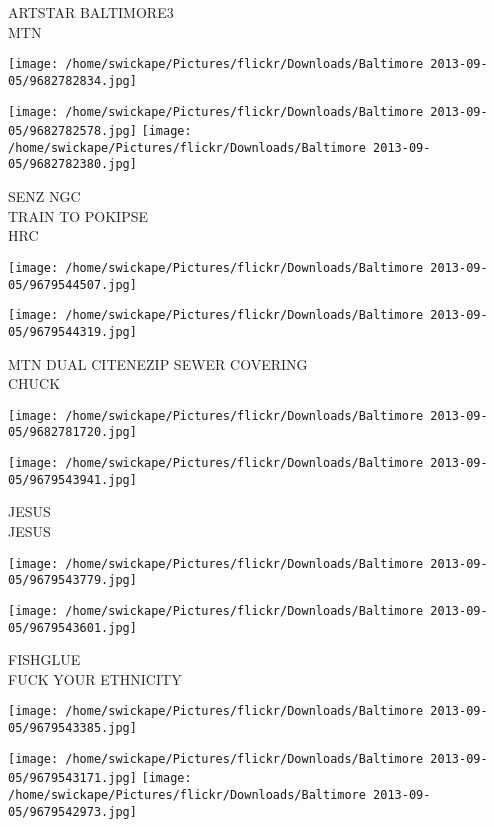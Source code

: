 \documentclass[10pt,letterpaper]{article}
\begin{document}
ARTSTAR BALTIMORE3\\
MTN
\pagebreak

\texttt{[image: /home/swickape/Pictures/flickr/Downloads/Baltimore 2013-09-05/9682782834.jpg]}

\vspace{0.25in}
\texttt{[image: /home/swickape/Pictures/flickr/Downloads/Baltimore 2013-09-05/9682782578.jpg]}
\texttt{[image: /home/swickape/Pictures/flickr/Downloads/Baltimore 2013-09-05/9682782380.jpg]}

SENZ NGC\\
TRAIN TO POKIPSE\\
HRC
\pagebreak

\texttt{[image: /home/swickape/Pictures/flickr/Downloads/Baltimore 2013-09-05/9679544507.jpg]}

\vspace{0.25in}
\texttt{[image: /home/swickape/Pictures/flickr/Downloads/Baltimore 2013-09-05/9679544319.jpg]}

MTN DUAL CITENEZIP SEWER COVERING\\
CHUCK
\pagebreak

\texttt{[image: /home/swickape/Pictures/flickr/Downloads/Baltimore 2013-09-05/9682781720.jpg]}

\vspace{0.25in}
\texttt{[image: /home/swickape/Pictures/flickr/Downloads/Baltimore 2013-09-05/9679543941.jpg]}

JESUS\\
JESUS
\pagebreak

\texttt{[image: /home/swickape/Pictures/flickr/Downloads/Baltimore 2013-09-05/9679543779.jpg]}

\vspace{0.25in}
\texttt{[image: /home/swickape/Pictures/flickr/Downloads/Baltimore 2013-09-05/9679543601.jpg]}

FISHGLUE\\
FUCK YOUR ETHNICITY
\pagebreak

\texttt{[image: /home/swickape/Pictures/flickr/Downloads/Baltimore 2013-09-05/9679543385.jpg]}

\vspace{0.25in}
\texttt{[image: /home/swickape/Pictures/flickr/Downloads/Baltimore 2013-09-05/9679543171.jpg]}
\texttt{[image: /home/swickape/Pictures/flickr/Downloads/Baltimore 2013-09-05/9679542973.jpg]}
\end{document}
